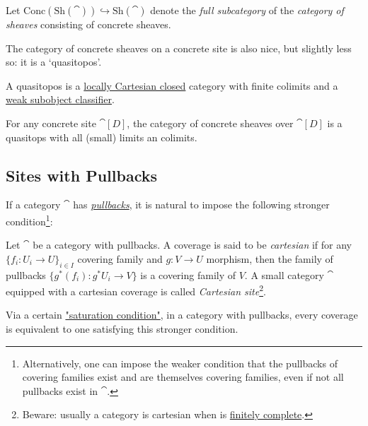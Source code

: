 \documentclass[a4paper,11pt]{article}  %
\begin{document}
\begin{definition} \label{ConcSheafOnConcSite}
Let $\mathrm{Conc}(\mathrm{Sh}(\cat)) \hookrightarrow \mathrm{Sh}(\cat)$ denote the \emph{full subcategory} of the \emph{category of sheaves} consisting of concrete sheaves.
\end{definition}



The category of concrete sheaves on a concrete site is also nice, but slightly less so: it is a ‘quasitopos’. 

\begin{definition}
A quasitopos is a \href{https://ncatlab.org/nlab/show/locally+cartesian+closed+category#definition}{locally Cartesian closed} category with finite colimits and a \href{https://ncatlab.org/nlab/show/subobject+classifier#weak_subobject_classifier}{weak subobject classifier}.
\end{definition}

\begin{theorem}
For any concrete site $\cat[D]$, the category of concrete sheaves over $\cat[D]$ is a quasitops with all (small) limits an colimits.
\end{theorem}

\subsection{Sites with Pullbacks}
%
If a category $\cat$ has \emph{\href{https://ncatlab.org/nlab/show/pullback}{pullbacks}}, it is natural to impose the following stronger condition\footnote{Alternatively, one can impose the weaker condition that the pullbacks of covering families exist and are themselves covering families, even if not all pullbacks exist in $\cat$.}:

\begin{definition}\label{Def:CartesianCover}
	Let $\cat$ be a category with pullbacks.
	A coverage is said to be \emph{cartesian} if for any \(\{f_i : U_i \to U\}_{i \in I}\)  covering family and \(g : V \to U\) morphism, then the family of pullbacks \(\{g^*(f_i) : g^*U_i \to V\}\) is a covering family of \(V\).
	A small category $\cat$ equipped with a cartesian coverage is called \emph{Cartesian site}\footnote{Beware: usually a category is cartesian when  is \href{https://ncatlab.org/nlab/show/finitely+complete+category\#definition}{finitely complete}.}.
\end{definition}
Via a certain \href{https://ncatlab.org/nlab/show/coverage\#saturation_conditions}{"saturation condition"}, in a category with pullbacks, every coverage is equivalent to one satisfying this stronger condition.
\end{document}
